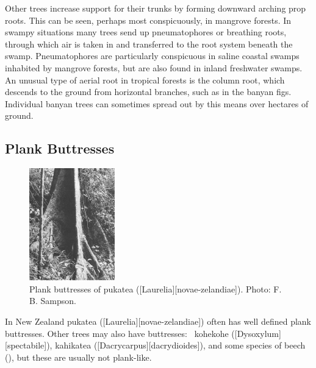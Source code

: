 Other trees increase support for their trunks by forming downward arching prop roots.
This can be seen, perhaps most conspicuously, in mangrove forests.
In swampy situations many trees send up pneumatophores or breathing roots, through which air is taken in and transferred to the root system beneath the swamp.
Pneumatophores are particularly conspicuous in saline coastal swamps inhabited by mangrove forests, but are also found in inland freshwater swamps.
An unusual type of aerial root in tropical forests is the column root, which descends to the ground from horizontal branches, such as in the banyan figs.
Individual banyan trees can sometimes spread out by this means over hectares of ground.

\subsection{Plank Buttresses}

\begin{figure}
	\includegraphics[width=0.33\textwidth]{graphics/figure9buttresses.jpg}
	\centering
	\caption[Plank buttresses of pukatea]{Plank buttresses of pukatea ([Laurelia][novae-zelandiae]).
	Photo:  F. B. Sampson.}%
	\label{fig:9buttresses}
\end{figure}

In New Zealand pukatea ([Laurelia][novae-zelandiae]) often has well defined plank buttresses.
Other trees may also have buttresses: \eg\ kohekohe ([Dysoxylum][spectabile]), kahikatea ([Dacrycarpus][dacrydioides]), and some species of beech (), but these are usually not plank-like.

